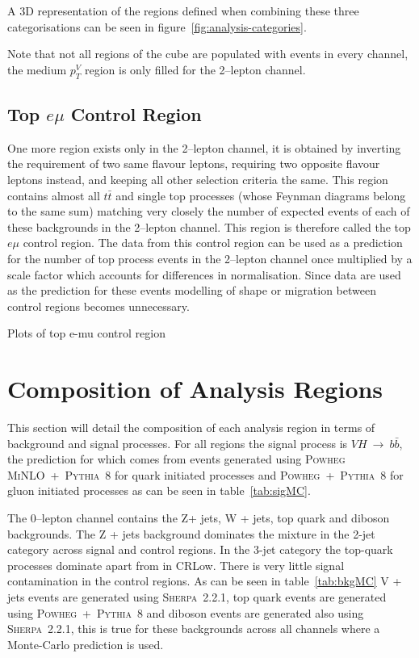 A 3D representation of the regions defined when combining these three
categorisations can be seen in figure~\ref{fig:analysis-categories}.

Note that not all regions of the cube are populated with events in every channel, the medium
$p_T^V$ region is only filled for the 2--lepton channel.

\subsection{Top \texorpdfstring{$e \mu$}{e mu} Control Region}%
\label{sec:topemucr}

One more region exists only in the 2--lepton channel, it is obtained by inverting the
requirement of two same flavour leptons, requiring two opposite flavour leptons
instead, and keeping all other selection criteria the same. This region contains
almost all $t\bar{t}$ and single top processes (whose Feynman diagrams belong to
the same sum) matching very closely the number of expected events of each of
these backgrounds in the 2--lepton channel. This region is therefore called the
top $e \mu$ control region. The data from this control region can be used as a
prediction for the number of top process events in the 2--lepton channel once
multiplied by a scale factor which accounts for differences in normalisation.
Since data are used as the prediction for these events modelling of shape or
migration between control regions becomes unnecessary.

Plots of top e-mu control region

\section{Composition of Analysis Regions}
\label{sec:composition}

This section will detail the composition of each analysis region in terms of
background and signal processes. For all regions the signal process is
$VH~\rightarrow~b\bar{b}$, the prediction for which comes from events generated
using \textsc{Powheg MiNLO}~+~\textsc{Pythia~8} for quark initiated processes
and \textsc{Powheg}~+~\textsc{Pythia~8} for gluon initiated processes as can be
seen in table~\ref{tab:sigMC}.


The 0--lepton channel contains the  Z+ jets, W + jets, top quark and diboson
backgrounds. The Z + jets background dominates the mixture in the 2-jet category
across signal and control regions. In the 3-jet category the top-quark processes
dominate apart from in CRLow. There is very little signal contamination in the
control regions. As can be seen in table~\ref{tab:bkgMC} V + jets events are
generated using \textsc{Sherpa~2.2.1}, top quark events are generated using
\textsc{Powheg}~+~\textsc{Pythia~8} and diboson events are generated also using
\textsc{Sherpa~2.2.1}, this is true for these backgrounds across all channels
where a Monte-Carlo prediction is used.


